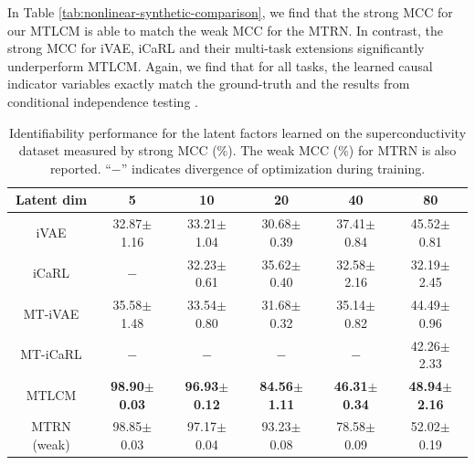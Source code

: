 \documentclass[10pt]{article} %
\theoremstyle{plain}
\theoremstyle{definition}
\begin{document}
In Table \ref{tab:nonlinear-synthetic-comparison}, we find that the strong MCC for our MTLCM is able to match the weak MCC for the MTRN.
In contrast, the strong MCC for iVAE, iCaRL and their multi-task extensions significantly underperform MTLCM. Again, we find that for all tasks, the learned causal indicator variables exactly match the ground-truth and the results from conditional independence testing \citep{chen2021causal,Lu_Wu_Hernandez-Lobato_Scholkopf_2022}.

\begin{table}[t]
\centering
\caption{Identifiability performance for the latent factors learned on the superconductivity dataset measured by strong MCC (\%). The weak MCC (\%) for MTRN is also reported. ``$-$'' indicates divergence of optimization during training.}
\begin{tabular}{cccccc}
\toprule
Latent dim & 5 & 10 & 20 & 40 & 80 \\ \midrule
iVAE         & 32.87$\pm$1.16 & 33.21$\pm$1.04 & 30.68$\pm$0.39 & 37.41$\pm$0.84 & 45.52$\pm$0.81 \\
iCaRL        & $-$ & 32.23$\pm$0.61 & 35.62$\pm$0.40 & 32.58$\pm$2.16 & 32.19$\pm$2.45 \\
MT-iVAE      & 35.58$\pm$1.48 & 33.54$\pm$0.80 & 31.68$\pm$0.32 & 35.14$\pm$0.82 & 44.49$\pm$0.96 \\
MT-iCaRL     & $-$ & $-$ & $-$ & $-$ & 42.26$\pm$2.33 \\
MTLCM        & \textbf{98.90$\pm$0.03} & \textbf{96.93$\pm$0.12} & \textbf{84.56$\pm$1.11} & \textbf{46.31$\pm$0.34} & \textbf{48.94$\pm$2.16} \\
\midrule
MTRN (weak) & 98.85$\pm$0.03 & 97.17$\pm$0.04 & 93.23$\pm$0.08 & 78.58$\pm$0.09 & 52.02$\pm$0.19 \\
\bottomrule
\end{tabular}
\label{tab:superconductivity-comparison}
\end{table}
\end{document}
